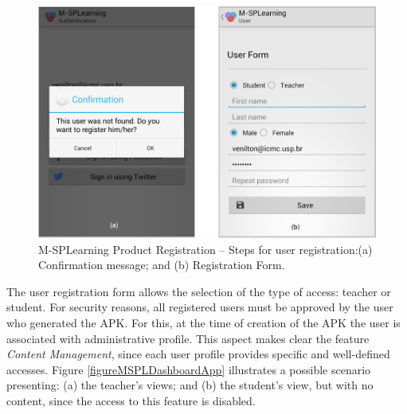 \begin{figure}[!ht]
\centering
\includegraphics[scale=0.35]{figures/section3/MSPLRegister}
\caption{M-SPLearning Product Registration -- Steps for user registration:\newline(a) Confirmation message; and (b) Registration Form.}
\label{figureMSPLRegister}
\vspace{0.65cm}
\end{figure}

The user registration form allows the selection of the type of access: teacher or student. For security reasons, all registered users must be approved by the user who generated the APK. For this, at the time of creation of the APK the user is associated with administrative profile. This aspect makes clear the feature \textit{Content Management}, since each user profile provides specific and well-defined accesses. Figure \ref{figureMSPLDashboardApp} illustrates a possible scenario presenting: (a) the teacher's views; and (b) the student's view, but with no content, since the access to this feature is disabled.


